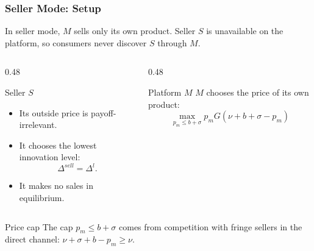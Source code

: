\begin{frame}
  \frametitle{Seller Mode: Setup}
  \footnotesize
  In seller mode, $M$ sells only its own product. Seller $S$ is unavailable on
  the platform, so consumers never discover $S$ through $M$.

  \begin{columns}[T,onlytextwidth]
    \begin{column}{0.48\textwidth}
      \begin{block}{Seller $S$}
        \begin{itemize}
          \item Its outside price is payoff-irrelevant.
          \item It chooses the lowest innovation level:
          \[
            \Delta^{sell}=\Delta^l.
          \]
          \item It makes no sales in equilibrium.
        \end{itemize}
      \end{block}
    \end{column}

    \begin{column}{0.48\textwidth}
      \begin{block}{Platform $M$}
        $M$ chooses the price of its own product:
        \begin{equation}
          \max_{p_m\leq b+\sigma}
          p_m G(\nu+b+\sigma-p_m)
          \label{eq:seller-profit}
        \end{equation}
      \end{block}
    \end{column}
  \end{columns}

  \begin{alertblock}{Price cap}
    The cap $p_m\leq b+\sigma$ comes from competition with fringe sellers in
    the direct channel: $\nu+\sigma+b-p_m\geq\nu$.
  \end{alertblock}
\end{frame}

